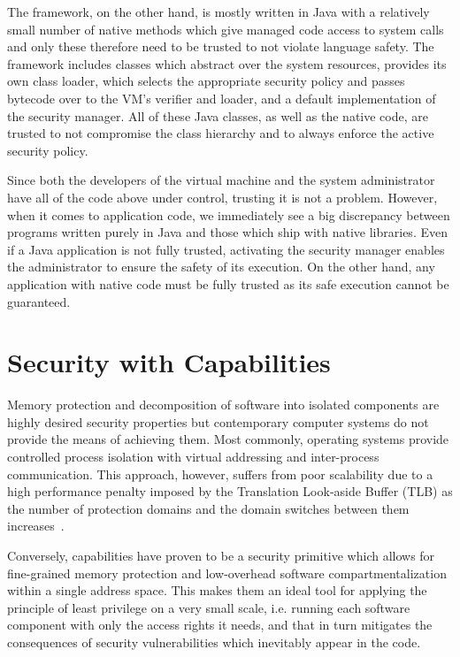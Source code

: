 \documentclass[a4paper,12pt,twoside,openright]{report}
\begin{document}
The framework, on the other hand, is mostly written in Java with a relatively small number of native methods which give managed code access to system calls and only these therefore need to be trusted to not violate language safety. The framework includes classes which abstract over the system resources, provides its own class loader, which selects the appropriate security policy and passes bytecode over to the VM's verifier and loader, and a default implementation of the security manager. All of these Java classes, as well as the native code, are trusted to not compromise the class hierarchy and to always enforce the active security policy.

Since both the developers of the virtual machine and the system administrator have all of the code above under control, trusting it is not a problem. However, when it comes to application code, we immediately see a big discrepancy between programs written purely in Java and those which ship with native libraries. Even if a Java application is not fully trusted, activating the security manager enables the administrator to ensure the safety of its execution. On the other hand, any application with native code must be fully trusted as its safe execution cannot be guaranteed.

\section{Security with Capabilities}

Memory protection and decomposition of software into isolated components are highly desired security properties but contemporary computer systems do not provide the means of achieving them. Most commonly, operating systems provide controlled process isolation with virtual addressing and inter-process communication. This approach, however, suffers from poor scalability due to a high performance penalty imposed by the Translation Look-aside Buffer (TLB) as the number of protection domains and the domain switches between them increases~\cite{watson2012cheri}.

Conversely, capabilities have proven to be a security primitive which allows for fine-grained memory protection and low-overhead software compartmentalization within a single address space. This makes them an ideal tool for applying the principle of least privilege on a very small scale, i.e. running each software component with only the access rights it needs, and that in turn mitigates the consequences of security vulnerabilities which inevitably appear in the code. 
\end{document}
